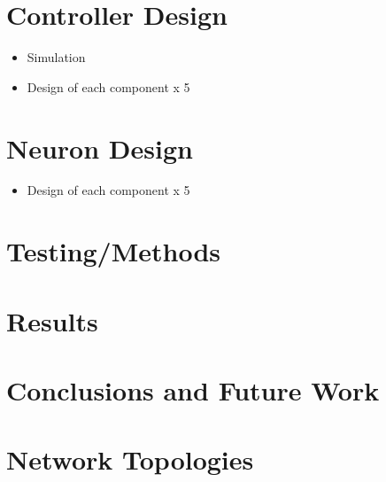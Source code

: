 \documentclass[12pt, letterpaper, oneside, onecolumn]{report} %
\begin{document}
\chapter{Controller Design}
\begin{itemize}
  \item Simulation
  \item Design of each component x 5
\end{itemize}


\chapter{Neuron Design}
\begin{itemize}
  \item Design of each component x 5
\end{itemize}


\chapter{Testing/Methods}

\chapter{Results}

\chapter{Conclusions and Future Work}


\appendix
\chapter{Network Topologies}


\nocite{*}
\printbibliography
\end{document}
